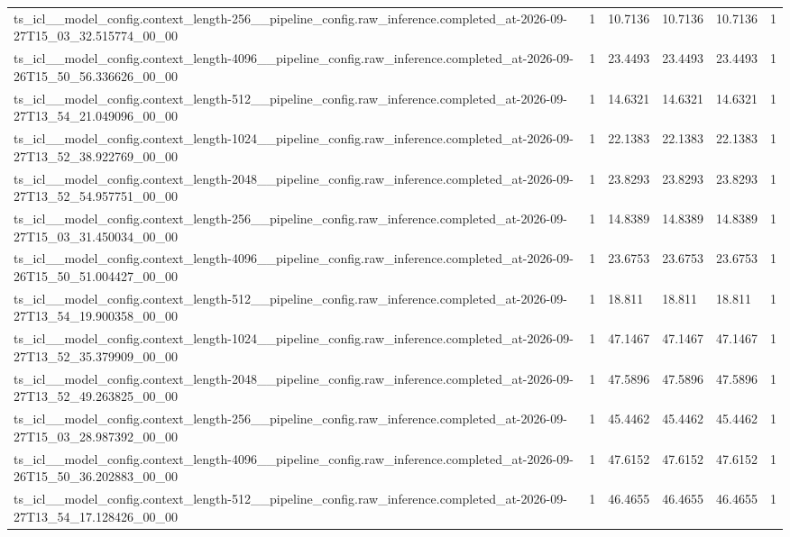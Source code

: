 \begin{tabular}{llllll}
ts\_icl\_\_model\_config.context\_length-256\_\_pipeline\_config.raw\_inference.completed\_at-2026-09-27T15\_03\_32.515774\_00\_00 & 1 & 10.7136 & 10.7136 & 10.7136 & 1 \\
ts\_icl\_\_model\_config.context\_length-4096\_\_pipeline\_config.raw\_inference.completed\_at-2026-09-26T15\_50\_56.336626\_00\_00 & 1 & 23.4493 & 23.4493 & 23.4493 & 1 \\
ts\_icl\_\_model\_config.context\_length-512\_\_pipeline\_config.raw\_inference.completed\_at-2026-09-27T13\_54\_21.049096\_00\_00 & 1 & 14.6321 & 14.6321 & 14.6321 & 1 \\
ts\_icl\_\_model\_config.context\_length-1024\_\_pipeline\_config.raw\_inference.completed\_at-2026-09-27T13\_52\_38.922769\_00\_00 & 1 & 22.1383 & 22.1383 & 22.1383 & 1 \\
ts\_icl\_\_model\_config.context\_length-2048\_\_pipeline\_config.raw\_inference.completed\_at-2026-09-27T13\_52\_54.957751\_00\_00 & 1 & 23.8293 & 23.8293 & 23.8293 & 1 \\
ts\_icl\_\_model\_config.context\_length-256\_\_pipeline\_config.raw\_inference.completed\_at-2026-09-27T15\_03\_31.450034\_00\_00 & 1 & 14.8389 & 14.8389 & 14.8389 & 1 \\
ts\_icl\_\_model\_config.context\_length-4096\_\_pipeline\_config.raw\_inference.completed\_at-2026-09-26T15\_50\_51.004427\_00\_00 & 1 & 23.6753 & 23.6753 & 23.6753 & 1 \\
ts\_icl\_\_model\_config.context\_length-512\_\_pipeline\_config.raw\_inference.completed\_at-2026-09-27T13\_54\_19.900358\_00\_00 & 1 & 18.811 & 18.811 & 18.811 & 1 \\
ts\_icl\_\_model\_config.context\_length-1024\_\_pipeline\_config.raw\_inference.completed\_at-2026-09-27T13\_52\_35.379909\_00\_00 & 1 & 47.1467 & 47.1467 & 47.1467 & 1 \\
ts\_icl\_\_model\_config.context\_length-2048\_\_pipeline\_config.raw\_inference.completed\_at-2026-09-27T13\_52\_49.263825\_00\_00 & 1 & 47.5896 & 47.5896 & 47.5896 & 1 \\
ts\_icl\_\_model\_config.context\_length-256\_\_pipeline\_config.raw\_inference.completed\_at-2026-09-27T15\_03\_28.987392\_00\_00 & 1 & 45.4462 & 45.4462 & 45.4462 & 1 \\
ts\_icl\_\_model\_config.context\_length-4096\_\_pipeline\_config.raw\_inference.completed\_at-2026-09-26T15\_50\_36.202883\_00\_00 & 1 & 47.6152 & 47.6152 & 47.6152 & 1 \\
ts\_icl\_\_model\_config.context\_length-512\_\_pipeline\_config.raw\_inference.completed\_at-2026-09-27T13\_54\_17.128426\_00\_00 & 1 & 46.4655 & 46.4655 & 46.4655 & 1 \\

\end{tabular}
